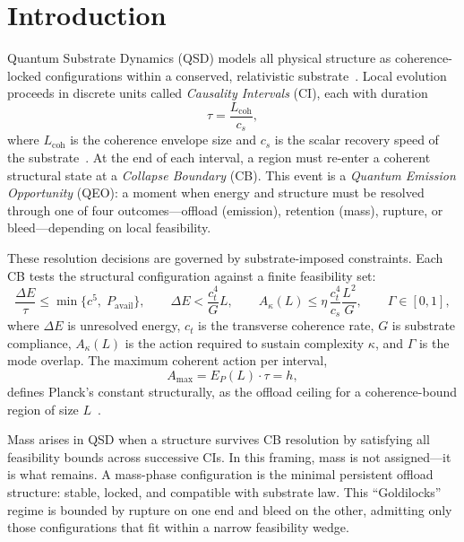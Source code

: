 \documentclass[preprints,article,submit,pdftex,moreauthors]{Definitions/mdpi}
\begin{document}
\section{Introduction}
Quantum Substrate Dynamics (QSD) models all physical structure as coherence-locked configurations within a conserved, relativistic substrate~\cite{bush2025}. Local evolution proceeds in discrete units called \emph{Causality Intervals} (CI), each with duration
\[
\tau = \frac{L_{\mathrm{coh}}}{c_s},
\]
where \( L_{\mathrm{coh}} \) is the coherence envelope size and \( c_s \) is the scalar recovery speed of the substrate~\cite{bush-collapse-2025,bush-planck-2025}. At the end of each interval, a region must re-enter a coherent structural state at a \emph{Collapse Boundary} (CB). This event is a \emph{Quantum Emission Opportunity} (QEO): a moment when energy and structure must be resolved through one of four outcomes—offload (emission), retention (mass), rupture, or bleed—depending on local feasibility.

These resolution decisions are governed by substrate-imposed constraints. Each CB tests the structural configuration against a finite feasibility set:
\begin{equation}
\frac{\Delta E}{\tau} \le \min\{c^5,\;P_{\mathrm{avail}}\}, \qquad
\Delta E < \frac{c_t^4}{G}L, \qquad
A_\kappa(L) \le \eta\,\frac{c_t^4}{c_s}\frac{L^2}{G}, \qquad
\Gamma \in [0,1],
\label{eq:intro_constraints}
\end{equation}
where \( \Delta E \) is unresolved energy, \( c_t \) is the transverse coherence rate, \( G \) is substrate compliance, \( A_\kappa(L) \) is the action required to sustain complexity \( \kappa \), and \( \Gamma \) is the mode overlap. The maximum coherent action per interval,
\[
A_{\max} = E_P(L) \cdot \tau = h,
\]
defines Planck’s constant structurally, as the offload ceiling for a coherence-bound region of size \( L \)~\cite{bush-planck-2025, bush-planck-ep}.

Mass arises in QSD when a structure survives CB resolution by satisfying all feasibility bounds across successive CIs. In this framing, mass is not assigned—it is what remains. A mass-phase configuration is the minimal persistent offload structure: stable, locked, and compatible with substrate law. This “Goldilocks” regime is bounded by rupture on one end and bleed on the other, admitting only those configurations that fit within a narrow feasibility wedge.
\end{document}
